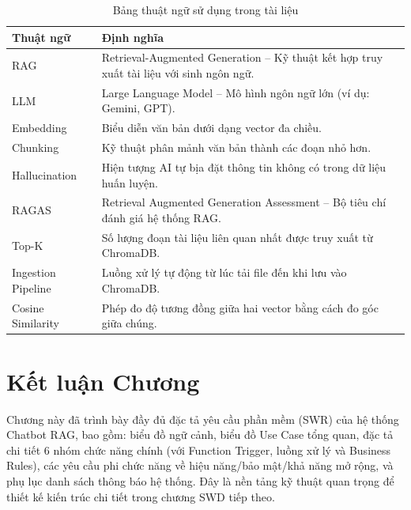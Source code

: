 \begin{table}[H]
  \centering
  \caption{Bảng thuật ngữ sử dụng trong tài liệu}
  \label{tab:glossary}
  \renewcommand{\arraystretch}{1.4}
  \begin{tabularx}{\textwidth}{|l|X|}
    \hline
    \rowcolor{blue!10}
    \textbf{Thuật ngữ} & \textbf{Định nghĩa} \\
    \hline
    RAG & Retrieval-Augmented Generation -- Kỹ thuật kết hợp truy xuất tài liệu với sinh ngôn ngữ. \\
    \hline
    LLM & Large Language Model -- Mô hình ngôn ngữ lớn (ví dụ: Gemini, GPT). \\
    \hline
    Embedding & Biểu diễn văn bản dưới dạng vector đa chiều. \\
    \hline
    Chunking & Kỹ thuật phân mảnh văn bản thành các đoạn nhỏ hơn. \\
    \hline
    Hallucination & Hiện tượng AI tự bịa đặt thông tin không có trong dữ liệu huấn luyện. \\
    \hline
    RAGAS & Retrieval Augmented Generation Assessment -- Bộ tiêu chí đánh giá hệ thống RAG. \\
    \hline
    Top-K & Số lượng đoạn tài liệu liên quan nhất được truy xuất từ ChromaDB. \\
    \hline
    Ingestion Pipeline & Luồng xử lý tự động từ lúc tải file đến khi lưu vào ChromaDB. \\
    \hline
    Cosine Similarity & Phép đo độ tương đồng giữa hai vector bằng cách đo góc giữa chúng. \\
    \hline
  \end{tabularx}
\end{table}

\section{Kết luận Chương}

Chương này đã trình bày đầy đủ đặc tả yêu cầu phần mềm (SWR) của hệ thống Chatbot RAG, bao gồm: biểu đồ ngữ cảnh, biểu đồ Use Case tổng quan, đặc tả chi tiết 6 nhóm chức năng chính (với Function Trigger, luồng xử lý và Business Rules), các yêu cầu phi chức năng về hiệu năng/bảo mật/khả năng mở rộng, và phụ lục danh sách thông báo hệ thống. Đây là nền tảng kỹ thuật quan trọng để thiết kế kiến trúc chi tiết trong chương SWD tiếp theo.
